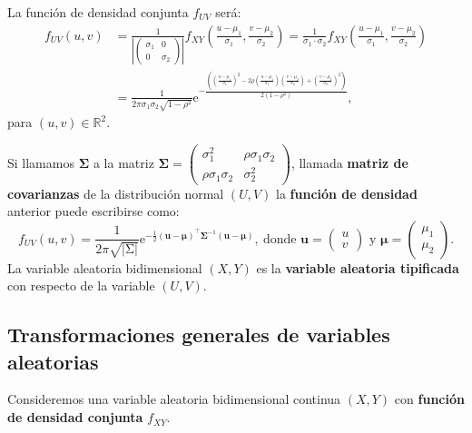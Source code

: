 \documentclass[]{book}
\begin{document}
La función de densidad conjunta \(f_{UV}\) será:
\[
\begin{array}{rl}
f_{UV}(u,v) & = \frac{1}{\left|\begin{pmatrix}\sigma_1 & 0\\ 0& \sigma_2\end{pmatrix}\right|} f_{XY}\left(\frac{u-\mu_1}{\sigma_1},\frac{v-\mu_2}{\sigma_2}\right)
=\frac{1}{\sigma_1\cdot \sigma_2}f_{XY}\left(\frac{u-\mu_1}{\sigma_1},\frac{v-\mu_2}{\sigma_2}\right)\\ & =
\frac{1}{2\pi\sigma_1\sigma_2\sqrt{1-\rho^2}}\mathrm{e}^{-\frac{\left(\left(\frac{u-\mu_1}{\sigma_1}\right)^2-2\rho \left(\frac{u-\mu_1}{\sigma_1}\right)\left(\frac{v-\mu_2}{\sigma_2}\right)+\left(\frac{v-\mu_2}{\sigma_2}\right)^2\right)}{2(1-\rho^2)}},
\end{array}
\]
para \((u,v)\in\mathbb{R}^2\).

Si llamamos \(\mathbf{\Sigma}\) a la matriz \(\mathbf{\Sigma}=\begin{pmatrix}\sigma_1^2 & \rho\sigma_1\sigma_2\\ \rho\sigma_1\sigma_2 & \sigma_2^2\end{pmatrix}\), llamada \textbf{matriz de covarianzas} de la distribución normal \((U,V)\) la \textbf{función de densidad} anterior puede escribirse como:
\[
f_{UV}(u,v)=\frac{1}{2\pi \sqrt{\left|\mathrm{\Sigma}\right|}}\mathrm{e}^{-\frac{1}{2}(\mathbf{u}-\mathbf{\mu})^\top \mathbf{\Sigma}^{-1}(\mathbf{u}-\mathbf{\mu})},\ \mbox{donde $\mathbf{u}=\begin{pmatrix}u \\ v\end{pmatrix}$ y $\mathbf{\mu}=\begin{pmatrix}\mu_1\\\mu_2\end{pmatrix}$.}
\]
La variable aleatoria bidimensional \((X,Y)\) es la \textbf{variable aleatoria tipificada} con respecto de la variable \((U,V)\).

\hypertarget{transformaciones-generales-de-variables-aleatorias}{%
\subsection{Transformaciones generales de variables aleatorias}\label{transformaciones-generales-de-variables-aleatorias}}

Consideremos una variable aleatoria bidimensional continua \((X,Y)\) con \textbf{función de densidad conjunta} \(f_{XY}\).
\end{document}
